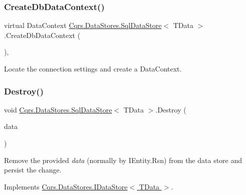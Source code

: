 \subsubsection{\texorpdfstring{Create\+Db\+Data\+Context()}{CreateDbDataContext()}}
{\footnotesize\ttfamily virtual Data\+Context \hyperlink{classCqrs_1_1DataStores_1_1SqlDataStore}{Cqrs.\+Data\+Stores.\+Sql\+Data\+Store}$<$ T\+Data $>$.Create\+Db\+Data\+Context (\begin{DoxyParamCaption}{ }\end{DoxyParamCaption})\hspace{0.3cm}{\ttfamily [protected]}, {\ttfamily [virtual]}}



Locate the connection settings and create a Data\+Context. 

\mbox{\label{classCqrs_1_1DataStores_1_1SqlDataStore_a5ec396c9eb202c8de931c1546c721ca3_a5ec396c9eb202c8de931c1546c721ca3}} 
\subsubsection{\texorpdfstring{Destroy()}{Destroy()}}
{\footnotesize\ttfamily void \hyperlink{classCqrs_1_1DataStores_1_1SqlDataStore}{Cqrs.\+Data\+Stores.\+Sql\+Data\+Store}$<$ T\+Data $>$.Destroy (\begin{DoxyParamCaption}\item[{T\+Data}]{data }\end{DoxyParamCaption})}



Remove the provided {\itshape data}  (normally by I\+Entity.\+Rsn) from the data store and persist the change. 



Implements \hyperlink{interfaceCqrs_1_1DataStores_1_1IDataStore_aa7ade96f2f3151d5353cf7bdbb2baec5_aa7ade96f2f3151d5353cf7bdbb2baec5}{Cqrs.\+Data\+Stores.\+I\+Data\+Store$<$ T\+Data $>$}.

\mbox{\label{classCqrs_1_1DataStores_1_1SqlDataStore_a975c0087677987dffccc4f0ffa97e691_a975c0087677987dffccc4f0ffa97e691}} 
